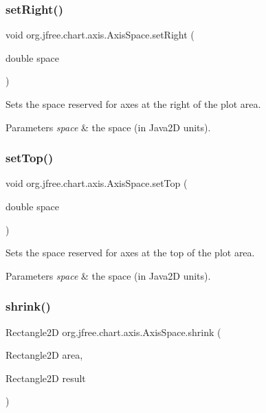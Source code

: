 \subsubsection{\texorpdfstring{set\+Right()}{setRight()}}
{\footnotesize\ttfamily void org.\+jfree.\+chart.\+axis.\+Axis\+Space.\+set\+Right (\begin{DoxyParamCaption}\item[{double}]{space }\end{DoxyParamCaption})}

Sets the space reserved for axes at the right of the plot area.


\begin{DoxyParams}{Parameters}
{\em space} & the space (in Java2D units). \\
\hline
\end{DoxyParams}
\mbox{\label{classorg_1_1jfree_1_1chart_1_1axis_1_1_axis_space_a04de149aaf43e467c5eeceea745ade9d}} 
\subsubsection{\texorpdfstring{set\+Top()}{setTop()}}
{\footnotesize\ttfamily void org.\+jfree.\+chart.\+axis.\+Axis\+Space.\+set\+Top (\begin{DoxyParamCaption}\item[{double}]{space }\end{DoxyParamCaption})}

Sets the space reserved for axes at the top of the plot area.


\begin{DoxyParams}{Parameters}
{\em space} & the space (in Java2D units). \\
\hline
\end{DoxyParams}
\mbox{\label{classorg_1_1jfree_1_1chart_1_1axis_1_1_axis_space_a4338e8f81c7ce8a380877abc0df1c0a5}} 
\subsubsection{\texorpdfstring{shrink()}{shrink()}}
{\footnotesize\ttfamily Rectangle2D org.\+jfree.\+chart.\+axis.\+Axis\+Space.\+shrink (\begin{DoxyParamCaption}\item[{Rectangle2D}]{area,  }\item[{Rectangle2D}]{result }\end{DoxyParamCaption})}

